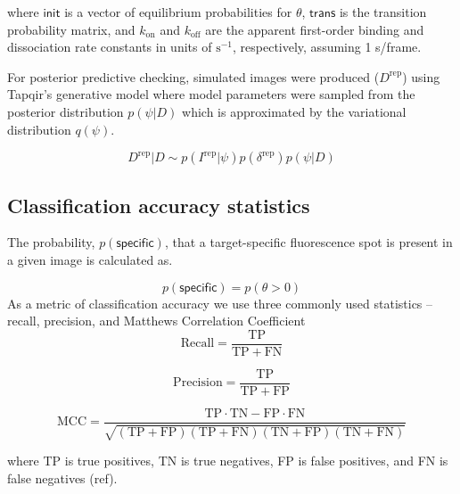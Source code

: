 \noindent
where $\mathsf{init}$ is a vector of equilibrium probabilities for $\theta$, $\mathsf{trans}$ is the transition probability matrix, and $k_{\mathrm{on}}$ and $k_{\mathrm{off}}$ are the apparent first-order binding and dissociation rate constants in units of $\mathrm{s}^{-1}$, respectively, assuming 1 s/frame.

For posterior predictive checking, simulated images were produced ($D^\mathrm{rep}$) using Tapqir's generative model where model parameters were sampled from the posterior distribution $p(\psi|D)$ which is approximated by the variational distribution $q(\psi)$. %

\begin{equation}
    D^\mathrm{rep} | D \sim p(I^\mathrm{rep} | \psi) p(\delta^\mathrm{rep}) p(\psi | D)
\end{equation}

\subsection*{Classification accuracy statistics}
The probability, $p(\mathsf{specific})$, that a target-specific fluorescence spot is present in a given image is calculated as.

\begin{equation}
    p(\mathsf{specific}) = p(\theta > 0)
\end{equation}
As a metric of classification accuracy we use three commonly used statistics -- recall, precision, and Matthews Correlation Coefficient \cite{Matthews1975-rw}
\begin{equation}
    \mathrm{Recall} = \dfrac{\mathrm{TP}}{\mathrm{TP} + \mathrm{FN}}
\end{equation}

\begin{equation}
    \mathrm{Precision} = \dfrac{\mathrm{TP}}{\mathrm{TP} + \mathrm{FP}}
\end{equation}

\begin{equation}
    \mathrm{MCC} =
        \dfrac{\mathrm{TP} \cdot \mathrm{TN} - \mathrm{FP} \cdot \mathrm{FN}}
        {\sqrt{(\mathrm{TP} + \mathrm{FP}) (\mathrm{TP} + \mathrm{FN}) (\mathrm{TN} + \mathrm{FP}) (\mathrm{TN} + \mathrm{FN})}}
\end{equation}

\noindent
where TP is true positives, TN is true negatives, FP is false positives, and FN is false negatives (ref).

